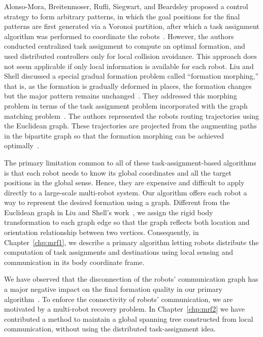 Alonso-Mora, Breitenmoser, Rufli, Siegwart, and Beardsley proposed a control
strategy to form arbitrary patterns, in which the goal positions for the final
patterns are first generated via a Voronoi partition, after which a task
assignment algorithm was performed to coordinate the robots~\cite{AloBreRufSieBea11}. 
%
However, the authors conducted centralized task assignment to compute an optimal formation, and used distributed controllers only for local collision avoidance.  
%
This approach does not seem applicable if only local information is available for each robot.  
%
Liu and Shell discussed a special gradual formation problem called ``formation morphing,'' 
that is, as the formation is gradually deformed in places, the formation changes but the major
pattern remains unchanged~\cite{LiuShe12}. 
%
They addressed this morphing problem in terms of the task assignment problem incorporated with the graph matching problem~\cite{Lov86}. 
%
The authors represented the robots routing trajectories using the Euclidean graph.  
%
These trajectories are projected from the augmenting paths in the bipartite graph so that the formation morphing can be achieved optimally~\cite{LiuShe12}.

The primary limitation common to all of these task-assignment-based algorithms
is that each robot needs to know its global coordinates and all the target
positions in the global sense. 
%
Hence, they are expensive and difficult to apply directly to a large-scale multi-robot system. 
%
Our algorithm offers each robot a way to represent the desired formation using a graph.
%
Different from the Euclidean graph in Liu and Shell's work~\cite{LiuShe12},
we assign the rigid body transformation to each graph edge so that the graph
reflects both location and orientation relationship between two vertices. 
%
Consequently, in Chapter~\ref{chp:mrf1}, we describe a primary algorithm letting robots 
distribute the computation of task assignments and destinations using local sensing
and communication in its body coordinate frame.


We have observed that the disconnection of the robots' communication
graph has a major negative impact on the final formation quality in our
primary algorithm~\cite{SonOKa14}. 
%
To enforce the connectivity of robots' communication,
we are motivated by a multi-robot recovery problem.
%
In Chapter~\ref{chp:mrf2} we have contributed a method to maintain a global
spanning tree constructed from local communication, 
without using the distributed task-assignment idea.


